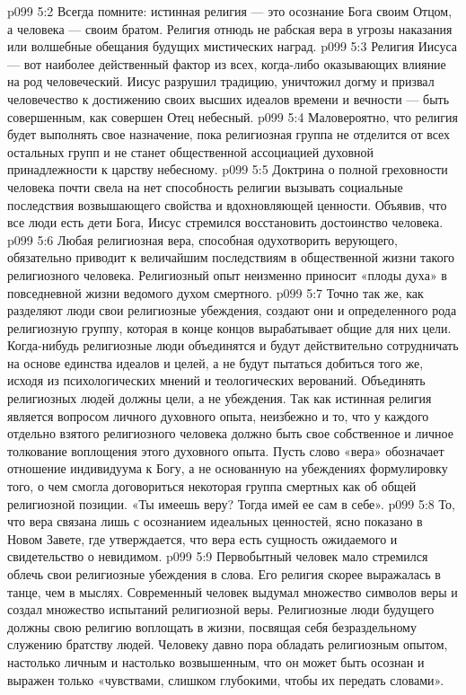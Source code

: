 \vs p099 5:2 Всегда помните: истинная религия --- это осознание Бога своим Отцом, а человека --- своим братом. Религия отнюдь не рабская вера в угрозы наказания или волшебные обещания будущих мистических наград.
\vs p099 5:3 \pc Религия Иисуса --- вот наиболее действенный фактор из всех, когда\hyp{}либо оказывающих влияние на род человеческий. Иисус разрушил традицию, уничтожил догму и призвал человечество к достижению своих высших идеалов времени и вечности --- быть совершенным, как совершен Отец небесный.
\vs p099 5:4 \pc Маловероятно, что религия будет выполнять свое назначение, пока религиозная группа не отделится от всех остальных групп и не станет общественной ассоциацией духовной принадлежности к царству небесному.
\vs p099 5:5 Доктрина о полной греховности человека почти свела на нет способность религии вызывать социальные последствия возвышающего свойства и вдохновляющей ценности. Объявив, что все люди есть дети Бога, Иисус стремился восстановить достоинство человека.
\vs p099 5:6 Любая религиозная вера, способная одухотворить верующего, обязательно приводит к величайшим последствиям в общественной жизни такого религиозного человека. Религиозный опыт неизменно приносит «плоды духа» в повседневной жизни ведомого духом смертного.
\vs p099 5:7 Точно так же, как разделяют люди свои религиозные убеждения, создают они и определенного рода религиозную группу, которая в конце концов вырабатывает общие для них цели. Когда\hyp{}нибудь религиозные люди объединятся и будут действительно сотрудничать на основе единства идеалов и целей, а не будут пытаться добиться того же, исходя из психологических мнений и теологических верований. Объединять религиозных людей должны цели, а не убеждения. Так как истинная религия является вопросом личного духовного опыта, неизбежно и то, что у каждого отдельно взятого религиозного человека должно быть свое собственное и личное толкование воплощения этого духовного опыта. Пусть слово «вера» обозначает отношение индивидуума к Богу, а не основанную на убеждениях формулировку того, о чем смогла договориться некоторая группа смертных как об общей религиозной позиции. «Ты имеешь веру? Тогда имей ее сам в себе».
\vs p099 5:8 То, что вера связана лишь с осознанием идеальных ценностей, ясно показано в Новом Завете, где утверждается, что вера есть сущность ожидаемого и свидетельство о невидимом.
\vs p099 5:9 Первобытный человек мало стремился облечь свои религиозные убеждения в слова. Его религия скорее выражалась в танце, чем в мыслях. Современный человек выдумал множество символов веры и создал множество испытаний религиозной веры. Религиозные люди будущего должны свою религию воплощать в жизни, посвящая себя безраздельному служению братству людей. Человеку давно пора обладать религиозным опытом, настолько личным и настолько возвышенным, что он может быть осознан и выражен только «чувствами, слишком глубокими, чтобы их передать словами».
